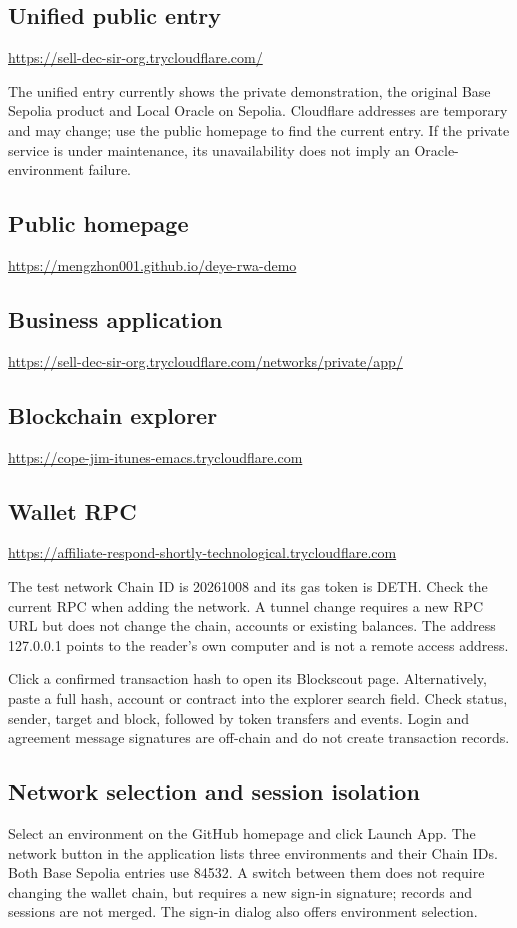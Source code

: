 \documentclass[12pt,a4paper]{article}
\begin{document}
\subsection{Unified public entry}
\url{https://sell-dec-sir-org.trycloudflare.com/}\par
The unified entry currently shows the private demonstration, the original Base Sepolia product and Local Oracle on Sepolia. Cloudflare addresses are temporary and may change; use the public homepage to find the current entry. If the private service is under maintenance, its unavailability does not imply an Oracle-environment failure.

\subsection{Public homepage}
\url{https://mengzhon001.github.io/deye-rwa-demo}\par
\subsection{Business application}
\url{https://sell-dec-sir-org.trycloudflare.com/networks/private/app/}\par
\subsection{Blockchain explorer}
\url{https://cope-jim-itunes-emacs.trycloudflare.com}\par
\subsection{Wallet RPC}
\url{https://affiliate-respond-shortly-technological.trycloudflare.com}\par
The test network Chain ID is 20261008 and its gas token is DETH. Check the current RPC when adding the network. A tunnel change requires a new RPC URL but does not change the chain, accounts or existing balances. The address 127.0.0.1 points to the reader’s own computer and is not a remote access address.

Click a confirmed transaction hash to open its Blockscout page. Alternatively, paste a full hash, account or contract into the explorer search field. Check status, sender, target and block, followed by token transfers and events. Login and agreement message signatures are off-chain and do not create transaction records.

\subsection{Network selection and session isolation}
Select an environment on the GitHub homepage and click Launch App. The network button in the application lists three environments and their Chain IDs. Both Base Sepolia entries use 84532. A switch between them does not require changing the wallet chain, but requires a new sign-in signature; records and sessions are not merged. The sign-in dialog also offers environment selection.
\end{document}
